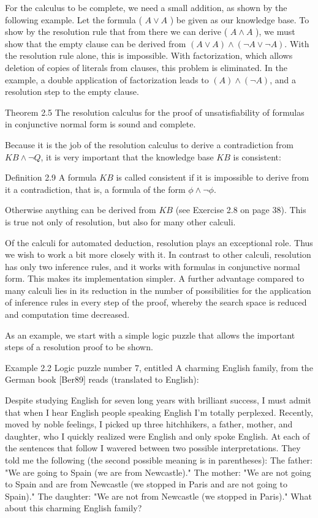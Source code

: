 \documentclass[10pt]{article}
\begin{document}
For the calculus to be complete, we need a small addition, as shown by the following example. Let the formula ( $A \vee A$ ) be given as our knowledge base. To show by the resolution rule that from there we can derive ( $A \wedge A$ ), we must show that the empty clause can be derived from $(A \vee A) \wedge(\neg A \vee \neg A)$. With the resolution rule alone, this is impossible. With factorization, which allows deletion of copies of literals from clauses, this problem is eliminated. In the example, a double application of factorization leads to $(A) \wedge(\neg A)$, and a resolution step to the empty clause.

Theorem 2.5 The resolution calculus for the proof of unsatisfiability of formulas in conjunctive normal form is sound and complete.

Because it is the job of the resolution calculus to derive a contradiction from $K B \wedge \neg Q$, it is very important that the knowledge base $K B$ is consistent:

Definition 2.9 A formula $K B$ is called consistent if it is impossible to derive from it a contradiction, that is, a formula of the form $\phi \wedge \neg \phi$.

Otherwise anything can be derived from $K B$ (see Exercise 2.8 on page 38). This is true not only of resolution, but also for many other calculi.

Of the calculi for automated deduction, resolution plays an exceptional role. Thus we wish to work a bit more closely with it. In contrast to other calculi, resolution has only two inference rules, and it works with formulas in conjunctive normal form. This makes its implementation simpler. A further advantage compared to many calculi lies in its reduction in the number of possibilities for the application of inference rules in every step of the proof, whereby the search space is reduced and computation time decreased.

As an example, we start with a simple logic puzzle that allows the important steps of a resolution proof to be shown.

Example 2.2 Logic puzzle number 7, entitled A charming English family, from the German book [Ber89] reads (translated to English):

\begin{displayquote}
Despite studying English for seven long years with brilliant success, I must admit that when I hear English people speaking English I'm totally perplexed. Recently, moved by noble feelings, I picked up three hitchhikers, a father, mother, and daughter, who I quickly realized were English and only spoke English. At each of the sentences that follow I wavered between two possible interpretations. They told me the following (the second possible meaning is in parentheses): The father: "We are going to Spain (we are from Newcastle)." The mother: "We are not going to Spain and are from Newcastle (we stopped in Paris and are not going to Spain)." The daughter: "We are not from Newcastle (we stopped in Paris)." What about this charming English family?
\end{displayquote}
\end{document}
